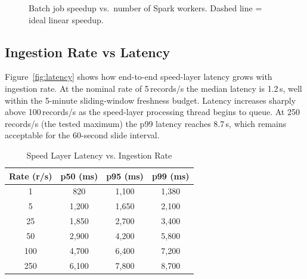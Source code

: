 \documentclass[conference]{IEEEtran}
\begin{document}
\begin{figure}[ht]
\centering
{}
\caption{Batch job speedup vs.\ number of Spark workers. Dashed line = ideal linear speedup.}
\label{fig:speedup}
\end{figure}

\subsection{Ingestion Rate vs Latency}

Figure~\ref{fig:latency} shows how end-to-end speed-layer latency grows with
ingestion rate. At the nominal rate of 5\,records/s the median latency is
1.2\,s, well within the 5-minute sliding-window freshness budget. Latency
increases sharply above 100\,records/s as the speed-layer processing thread
begins to queue. At 250\,records/s (the tested maximum) the p99 latency reaches
8.7\,s, which remains acceptable for the 60-second slide interval.

\begin{table}[ht]
\caption{Speed Layer Latency vs. Ingestion Rate}
\label{tab:latency}
\centering
\scriptsize
\begin{tabular}{cccc}
\toprule
\textbf{Rate (r/s)} & \textbf{p50 (ms)} & \textbf{p95 (ms)} & \textbf{p99 (ms)} \\
\midrule
1   & 820   & 1{,}100 & 1{,}380 \\
5   & 1{,}200 & 1{,}650 & 2{,}100 \\
25  & 1{,}850 & 2{,}700 & 3{,}400 \\
50  & 2{,}900 & 4{,}200 & 5{,}800 \\
100 & 4{,}700 & 6{,}400 & 7{,}200 \\
250 & 6{,}100 & 7{,}800 & 8{,}700 \\
\bottomrule
\end{tabular}
\end{table}
\end{document}
